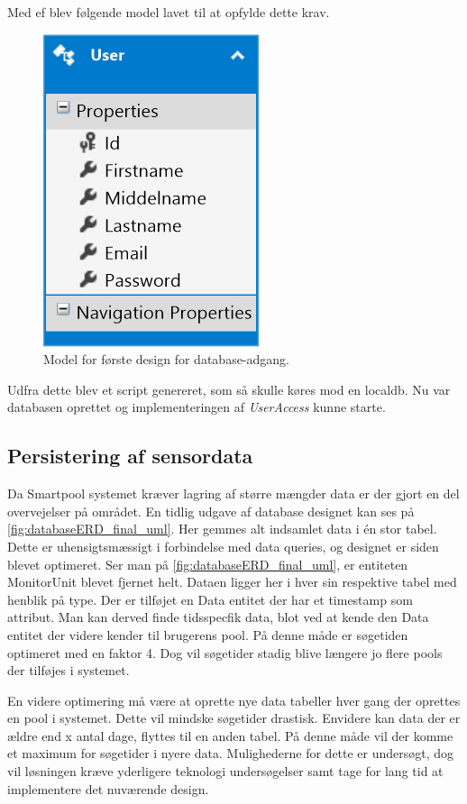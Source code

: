 Med \gls{ef} blev følgende model lavet til at opfylde dette krav.

\begin{figure}[h]
	\centering
	\includegraphics[width=0.25\linewidth]{figs/design/database_model_1}
	\caption{Model for første design for database-adgang.}
	\label{fig:database_model_1}
\end{figure}

Udfra dette blev et script genereret, som så skulle køres mod en localdb. Nu var databasen oprettet og implementeringen af \textit{UserAccess} kunne starte.

\subsection{Persistering af sensordata}
Da Smartpool systemet kræver lagring af større mængder data er der gjort en del overvejelser på området. En tidlig udgave af database designet kan ses på \ref{fig:databaseERD_final_uml}. Her gemmes alt indsamlet data i én stor tabel. Dette er uhensigtsmæssigt i forbindelse med data queries, og designet er siden blevet optimeret. Ser man på \ref{fig:databaseERD_final_uml}, er entiteten MonitorUnit blevet fjernet helt. Dataen ligger her i hver sin respektive tabel med henblik på type. Der er tilføjet en Data entitet der har et timestamp som attribut. Man kan derved finde tidsspecfik data, blot ved at kende den Data entitet der videre kender til brugerens pool. På denne måde er søgetiden optimeret med en faktor 4. Dog vil søgetider stadig blive længere jo flere pools der tilføjes i systemet.

En videre optimering må være at oprette nye data tabeller hver gang der oprettes en pool i systemet. Dette vil mindske søgetider drastisk. Envidere kan data der er ældre end x antal dage, flyttes til en anden tabel. På denne måde vil der komme et maximum for søgetider i nyere data.
Mulighederne for dette er undersøgt, dog vil løsningen kræve yderligere teknologi undersøgelser samt tage for lang tid at implementere det nuværende design.

